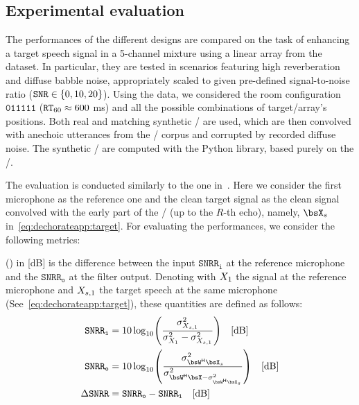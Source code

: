 \subsection{Experimental evaluation}
The performances of the different designs are compared on the task of enhancing a target speech signal in a 5-channel mixture using a linear array from the \dEchorate{} dataset.
In particular, they are tested in scenarios featuring high reverberation and diffuse babble noise, appropriately scaled to given pre-defined signal-to-noise ratio ($\SNR \in \kbrace{0, 10, 20}$).
Using the \dEchorate{} data, we considered the room configuration $\mathtt{011111}$ ($\mathtt{RT}_{60} \approx 600 $ ms) and all the possible combinations of target/array's positions.
Both real and matching synthetic \RIRs/ are used, which are then convolved with anechoic utterances from the \WSJ/ corpus and corrupted by recorded diffuse noise.
The synthetic \RIRs/ are computed with the \href{https://github.com/LCAV/pyroomacoustics}{} Python library, based purely on the \ISMdef/.

\mynewline
The evaluation is conducted similarly to the one in~.
Here we consider the first microphone as the reference one and the clean target signal as the clean signal convolved with the early part of the \RIR/ (up to the $R$-th echo),
namely, $\MICS_s$ in~\cref{eq:dechorateapp:target}.
For evaluating the performances, we consider the following metrics:

 (\DSNRR) in [dB] is the difference between the input $\mathtt{SNRR}_\mathtt{i}$ at the reference microphone and the $\mathtt{SNRR}_\mathtt{o}$ at the filter output.
Denoting with $X_1$ the signal at the reference microphone and $X_{s,1}$ the target speech at the same microphone (See~\cref{eq:dechorateapp:target}), these quantities are defined as follows:
\newcommand{\hbsW}{\khermitian{\bsW}}
    \begin{equation}
        \begin{aligned}
            \mathtt{SNRR}_\mathtt{i} &= 10 \log_{10} \kparen{\frac{\sigma^2_{\MIC_{s, 1}}}
                                                            {\sigma^2_{\MIC_{1}} -  \sigma^2_{\MIC_{s, 1}}}} \quad\text{[dB]}\\
            \mathtt{SNRR}_\mathtt{o} &= 10 \log_{10} \kparen{\frac{\sigma^2_{\hbsW \MICS_{s}}}
                                                            {\sigma^2_{\hbsW \MICS -  \sigma^2_{\hbsW \MICS_{s}}}}} \quad\text{[dB]}\\
            \DSNRR &= \mathtt{SNRR}_\mathtt{o} - \mathtt{SNRR}_\mathtt{i} \quad\text{[dB]}
        \end{aligned}
    \end{equation}

